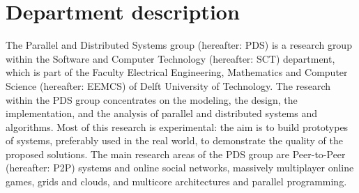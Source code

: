 \section{Department description}
The Parallel and Distributed Systems group (hereafter: PDS) is a research group within the Software and Computer Technology (hereafter: SCT) department, which is part of the Faculty Electrical Engineering, Mathematics and Computer Science (hereafter: EEMCS) of Delft University of Technology. The research within the PDS group concentrates on the modeling, the design, the implementation, and the analysis of parallel and distributed systems and algorithms. Most of this research is experimental: the aim is to build prototypes of systems, preferably used in the real world, to demonstrate the quality of the proposed solutions. The main research areas of the PDS group are Peer-to-Peer (hereafter: P2P) systems and online social networks, massively multiplayer online games, grids and clouds, and multicore architectures and parallel programming. 
